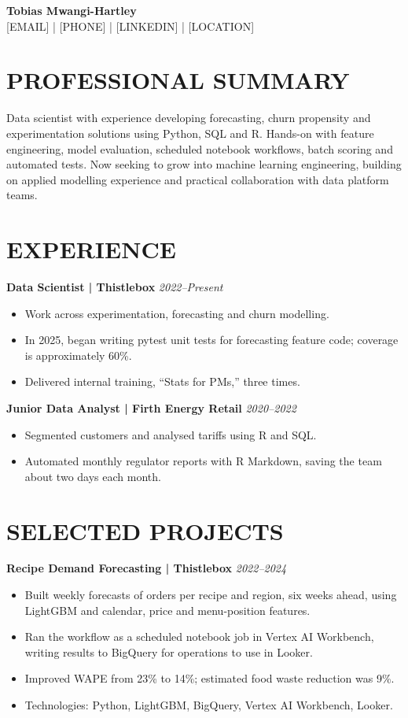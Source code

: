 \documentclass[11pt,a4paper]{article}
\begin{document}
\begin{center}
{\Huge\bfseries\color{primarycolor} Tobias Mwangi-Hartley}\\[0.4em]
{\small [EMAIL] | [PHONE] | [LINKEDIN] | [LOCATION]}
\end{center}

\section*{PROFESSIONAL SUMMARY}
Data scientist with experience developing forecasting, churn propensity and experimentation solutions using Python, SQL and R. Hands-on with feature engineering, model evaluation, scheduled notebook workflows, batch scoring and automated tests. Now seeking to grow into machine learning engineering, building on applied modelling experience and practical collaboration with data platform teams.

\section*{EXPERIENCE}
\textbf{Data Scientist | Thistlebox} \hfill \textit{2022–Present}
\begin{itemize}
\item Work across experimentation, forecasting and churn modelling.
\item In 2025, began writing pytest unit tests for forecasting feature code; coverage is approximately 60\%.
\item Delivered internal training, “Stats for PMs,” three times.
\end{itemize}

\textbf{Junior Data Analyst | Firth Energy Retail} \hfill \textit{2020–2022}
\begin{itemize}
\item Segmented customers and analysed tariffs using R and SQL.
\item Automated monthly regulator reports with R Markdown, saving the team about two days each month.
\end{itemize}

\section*{SELECTED PROJECTS}
\textbf{Recipe Demand Forecasting | Thistlebox} \hfill \textit{2022–2024}
\begin{itemize}
\item Built weekly forecasts of orders per recipe and region, six weeks ahead, using LightGBM and calendar, price and menu-position features.
\item Ran the workflow as a scheduled notebook job in Vertex AI Workbench, writing results to BigQuery for operations to use in Looker.
\item Improved WAPE from 23\% to 14\%; estimated food waste reduction was 9\%.
\item Technologies: Python, LightGBM, BigQuery, Vertex AI Workbench, Looker.
\end{itemize}
\end{document}
